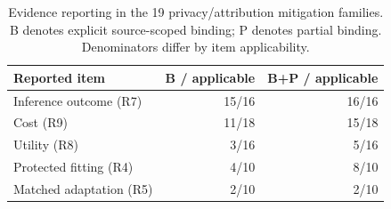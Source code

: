 \begin{table}[t]\centering\footnotesize
\caption{Evidence reporting in the 19 privacy/attribution mitigation families. B denotes explicit source-scoped binding; P denotes partial binding. Denominators differ by item applicability.}\label{tab:r35-reporting}
\begin{tabularx}{\columnwidth}{@{}Yrr@{}}\toprule
Reported item & B / applicable & B+P / applicable\\\midrule
Inference outcome (R7) & 15/16 & 16/16\\
Cost (R9) & 11/18 & 15/18\\
Utility (R8) & 3/16 & 5/16\\
Protected fitting (R4) & 4/10 & 8/10\\
Matched adaptation (R5) & 2/10 & 2/10\\
\bottomrule\end{tabularx}\end{table}
